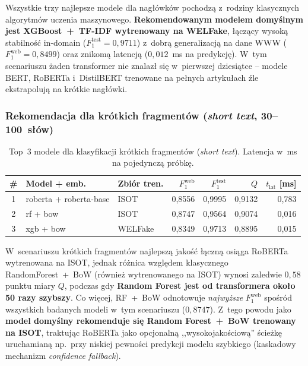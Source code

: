 \documentclass[oneside,polski,logo]{amuthesis}
\begin{document}
Wszystkie trzy najlepsze modele dla nagłówków pochodzą z~rodziny
klasycznych algorytmów uczenia maszynowego. \textbf{Rekomendowanym
modelem domyślnym jest XGBoost~+~TF-IDF wytrenowany na WELFake},
łączący wysoką stabilność in-domain (\(F_1^{\text{test}} = 0{,}9711\))
z~dobrą generalizacją na dane WWW (\(F_1^{\text{web}} = 0{,}8499\))
oraz znikomą latencją (\(0{,}012\)~ms na predykcję). W~tym scenariuszu
żaden transformer nie znalazł się w~pierwszej dziesiątce -- modele
BERT, RoBERTa i~DistilBERT trenowane na pełnych artykułach źle
ekstrapolują na krótkie nagłówki.

\subsubsection*{Rekomendacja dla krótkich fragmentów
(\textit{short text}, 30--100~słów)}

\begin{table}[ht]
\centering
\caption{Top~3 modele dla klasyfikacji krótkich fragmentów
(\textit{short text}). Latencja w~ms na pojedynczą próbkę.}
\label{tab:rek_short}
\begin{tabular}{cllrrrr}
\toprule
\# & Model + emb. & Zbiór tren. & $F_1^{\text{web}}$ & $F_1^{\text{test}}$ & $Q$ & $t_{\text{lat}}$ [ms] \\
\midrule
1 & roberta + roberta-base & ISOT    & 0,8556 & 0,9995 & 0,9132 & 0,783 \\
2 & rf + bow               & ISOT    & 0,8747 & 0,9564 & 0,9074 & 0,016 \\
3 & xgb + bow              & WELFake & 0,8349 & 0,9713 & 0,8895 & 0,015 \\
\bottomrule
\end{tabular}
\end{table}

W~scenariuszu krótkich fragmentów najlepszą jakość łączną osiąga
RoBERTa wytrenowana na ISOT, jednak różnica względem klasycznego
RandomForest~+~BoW (również wytrenowanego na ISOT) wynosi zaledwie
\(0{,}58\) punktu miary $Q$, podczas gdy \textbf{Random Forest jest
od transformera około 50 razy szybszy}. Co więcej, RF~+~BoW
odnotowuje \emph{najwyższe} $F_1^{\text{web}}$ spośród wszystkich
badanych modeli w~tym scenariuszu (\(0{,}8747\)). Z~tego powodu jako
\textbf{model domyślny rekomenduje się Random Forest~+~BoW trenowany
na ISOT}, traktując RoBERTa jako opcjonalną ,,wysokojakościową''
ścieżkę uruchamianą np.\ przy niskiej pewności predykcji modelu
szybkiego (kaskadowy mechanizm \textit{confidence fallback}).
\end{document}
